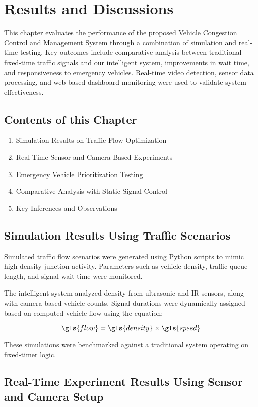 \chapter{Results and Discussions}

This chapter evaluates the performance of the proposed Vehicle Congestion Control and Management System through a combination of simulation and real-time testing. Key outcomes include comparative analysis between traditional fixed-time traffic signals and our intelligent system, improvements in wait time, and responsiveness to emergency vehicles. Real-time video detection, sensor data processing, and web-based dashboard monitoring were used to validate system effectiveness.

\section{Contents of this Chapter}
\begin{enumerate}
    \item Simulation Results on Traffic Flow Optimization
    \item Real-Time Sensor and Camera-Based Experiments
    \item Emergency Vehicle Prioritization Testing
    \item Comparative Analysis with Static Signal Control
    \item Key Inferences and Observations
\end{enumerate}

\section{Simulation Results Using Traffic Scenarios}

Simulated traffic flow scenarios were generated using Python scripts to mimic high-density junction activity. Parameters such as vehicle density, traffic queue length, and signal wait time were monitored.

The intelligent system analyzed density from ultrasonic and IR sensors, along with camera-based vehicle counts. Signal durations were dynamically assigned based on computed vehicle flow using the equation:

\[
\gls{flow} = \gls{density} \times \gls{speed}
\]

These simulations were benchmarked against a traditional system operating on fixed-timer logic.

\section{Real-Time Experiment Results Using Sensor and Camera Setup}

